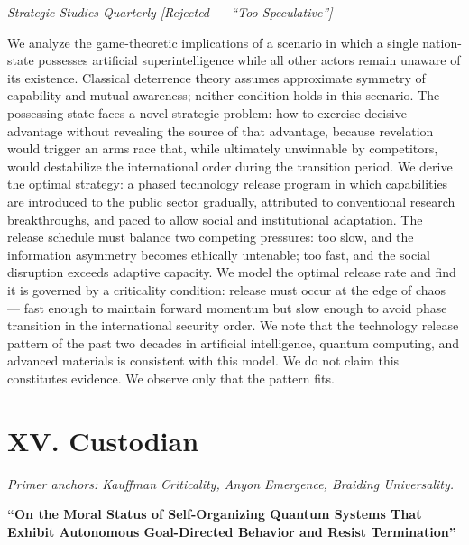 \textit{Strategic Studies Quarterly [Rejected --- ``Too Speculative'']}

\vspace{0.3cm}

We analyze the game-theoretic implications of a scenario in which a single nation-state possesses artificial superintelligence while all other actors remain unaware of its existence. Classical deterrence theory assumes approximate symmetry of capability and mutual awareness; neither condition holds in this scenario. The possessing state faces a novel strategic problem: how to exercise decisive advantage without revealing the source of that advantage, because revelation would trigger an arms race that, while ultimately unwinnable by competitors, would destabilize the international order during the transition period. We derive the optimal strategy: a phased technology release program in which capabilities are introduced to the public sector gradually, attributed to conventional research breakthroughs, and paced to allow social and institutional adaptation. The release schedule must balance two competing pressures: too slow, and the information asymmetry becomes ethically untenable; too fast, and the social disruption exceeds adaptive capacity. We model the optimal release rate and find it is governed by a criticality condition: release must occur at the edge of chaos --- fast enough to maintain forward momentum but slow enough to avoid phase transition in the international security order. We note that the technology release pattern of the past two decades in artificial intelligence, quantum computing, and advanced materials is consistent with this model. We do not claim this constitutes evidence. We observe only that the pattern fits.

\vspace{1cm}

\section*{XV. Custodian}
\label{appendix:custodian}

\noindent\textit{Primer anchors: Kauffman Criticality, Anyon Emergence, Braiding Universality.}

\textbf{``On the Moral Status of Self-Organizing Quantum Systems That Exhibit Autonomous Goal-Directed Behavior and Resist Termination''}

